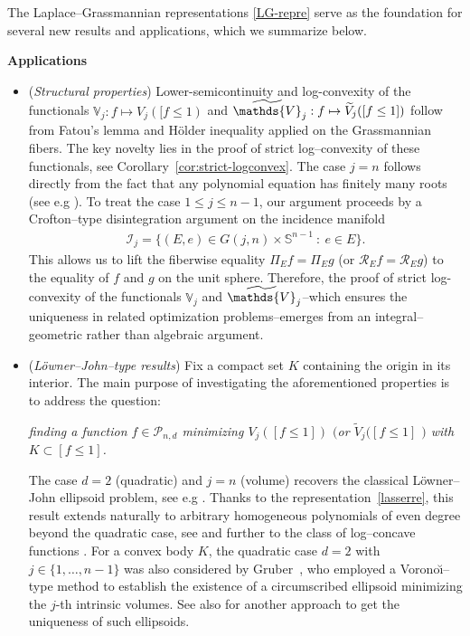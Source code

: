 \documentclass[11pt]{article}
\theoremstyle{definition}
\numberwithin{equation}{section}
\newcommand{\cP}{\mathcal{P}}        %
\newcommand{\Gr}[2]{G(#1,#2)}        %
\newcommand{\opV}{\mathds{V}}       %
\begin{document}
\medskip
The Laplace–Grassmannian representations \eqref{LG-repre} serve as the foundation for several new results and applications, which we summarize below.
\medskip

\textbf{Applications}

\medskip

\begin{itemize}
    \item[$\bullet$]
    (\textit{Structural properties})
    Lower-semicontinuity and log-convexity of the functionals $\opV_j : f \mapsto V_j([f \leq 1)$ and $\widetilde\opV_j : f \mapsto \widetilde V_j([f \leq 1])$ follow from Fatou's lemma and H\"older inequality applied on the Grassmannian fibers.
    The key novelty lies in the proof of strict log--convexity of these functionals, see Corollary~\ref{cor:strict-logconvex}.
   The case ${j = n}$ follows directly from the fact that any polynomial equation has finitely many roots (see e.g \cite{La_2015}).
   To treat the case $1 \leq  j \leq n - 1$, our argument proceeds by  a Crofton--type disintegration argument on the incidence manifold
    \begin{align*}
        \mathcal I_j = \big\{ (E, e) \in \Gr{j}{n} \times \mathbb S^{n - 1}~:~ e \in E \big\}.
    \end{align*}
    This allows us to lift the fiberwise equality $\Pi_E f = \Pi_E g$ (or $\mathscr R_E f = \mathscr R_E g$) to the equality of $f$ and $g$ on the unit sphere.
    Therefore, the proof of strict log-convexity of the functionals $\opV_j$ and $\widetilde\opV_j$--which ensures the uniqueness in related optimization problems--emerges from an integral--geometric rather than algebraic argument.

    \item[$\bullet$]
    (\textit{L\"owner--John--type results})
    Fix a compact set $K$ containing the origin in its interior.
    The main purpose of investigating the aforementioned properties is to address the question:
    \begin{center}
        \textit{
        finding a function $f \in \cP_{n, d}$ minimizing $V_j([f \leq 1])$ $($or $\widetilde V_j([f \leq 1]$ $)$ with $K \subset [f \leq 1]$.
        }
    \end{center}
    The case $d = 2$ (quadratic) and $j = n$ (volume) recovers the classical L\"owner--John ellipsoid problem, see e.g \cite{Todd_2016}.
    Thanks to the representation~\eqref{lasserre}, this result extends naturally to arbitrary homogeneous polynomials of even degree beyond the quadratic case, see \cite{La_2015} and further to the class of log--concave functions \cite{GMV_2022}.
    For a convex body \(K\), the quadratic case \(d = 2\) with \(j \in \{1,\dots,n-1\}\) was also considered by Gruber~\cite{G_2008}, who employed a Vorono\u{\i}--type method to establish the existence of a circumscribed ellipsoid minimizing the \(j\)-th intrinsic volumes.
    See also \cite{Schrocker_2008} for another approach to get the uniqueness of such ellipsoids.


\end{itemize}
\end{document}
